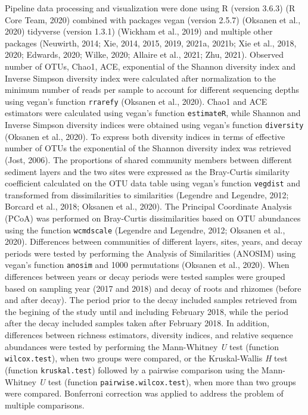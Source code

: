 \documentclass[12pt,]{article}
\begin{document}
Pipeline data processing and visualization were done using R (version
3.6.3) (R Core Team, 2020) combined with packages vegan (version 2.5.7)
(Oksanen et al., 2020) tidyverse (version 1.3.1) (Wickham et al., 2019)
and multiple other packages (Neuwirth, 2014; Xie, 2014, 2015, 2019,
2021a, 2021b; Xie et al., 2018, 2020; Edwards, 2020; Wilke, 2020;
Allaire et al., 2021; Zhu, 2021). Observed number of OTUs, Chao1, ACE,
exponential of the Shannon diversity index and Inverse Simpson diversity
index were calculated after normalization to the minimum number of reads
per sample to account for different sequencing depths using vegan's
function \texttt{rrarefy} (Oksanen et al., 2020). Chao1 and ACE
estimators were calculated using vegan's function \texttt{estimateR},
while Shannon and Inverse Simpson diversity indices were obtained using
vegan's function \texttt{diversity} (Oksanen et al., 2020). To express
both diversity indices in terms of effective number of OTUs the
exponential of the Shannon diversity index was retrieved (Jost, 2006).
The proportions of shared community members between different sediment
layers and the two sites were expressed as the Bray-Curtis similarity
coefficient calculated on the OTU data table using vegan's function
\texttt{vegdist} and transformed from dissimilarities to similarities
(Legendre and Legendre, 2012; Borcard et al., 2018; Oksanen et al.,
2020). The Principal Coordinate Analysis (PCoA) was performed on
Bray-Curtis dissimilarities based on OTU abundances using the function
\texttt{wcmdscale} (Legendre and Legendre, 2012; Oksanen et al., 2020).
Differences between communities of different layers, sites, years, and
decay periods were tested by performing the Analysis of Similarities
(ANOSIM) using vegan's function \texttt{anosim} and 1000 permutations
(Oksanen et al., 2020). When differences between years or decay periods
were tested samples were grouped based on sampling year (2017 and 2018)
and decay of roots and rhizomes (before and after decay). The period
prior to the decay included samples retrieved from the begining of the
study until and including February 2018, while the period after the
decay included samples taken after February 2018. In addition,
differences between richness estimators, diversity indices, and relative
sequence abundances were tested by performing the Mann-Whitney \emph{U}
test (function \texttt{wilcox.test}), when two groups were compared, or
the Kruskal-Wallis \emph{H} test (function \texttt{kruskal.test})
followed by a pairwise comparison using the Mann-Whitney \emph{U} test
(function \texttt{pairwise.wilcox.test}), when more than two groups were
compared. Bonferroni correction was applied to address the problem of
multiple comparisons.
\end{document}
